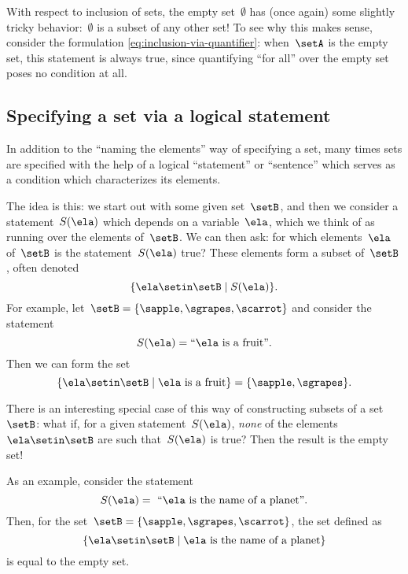With respect to inclusion of sets, the empty set~$\emptyset$ has (once again) some slightly tricky behavior:~$\emptyset$ is a subset of any other set!
To see why this makes sense, consider the formulation \cref{eq:inclusion-via-quantifier}: when~$\setA$ is the empty set, this statement is always true, since quantifying ``for all'' over the empty set poses no condition at all.

\subsection{Specifying a set via a logical statement}

In addition to the ``naming the elements'' way of specifying a set, many times sets are specified with the help of a logical ``statement'' or ``sentence'' which serves as a condition which characterizes its elements.

The idea is this: we start out with some given set~$\setB$, and then we consider a statement~$S(\ela)$ which depends on a variable~$\ela$, which we think of as running over the elements of~$\setB$.
We can then ask: for which elements~$\ela$ of~$\setB$ is the statement~$S(\ela)$ true?
These elements form a subset of~$\setB$, often denoted
%
\begin{equation}
    \label{eq:axiom-specialization}
    \{ \ela \setin\setB \mid S(\ela) \}.
\end{equation}
%
For example, let~$\setB = \{ \sapple, \sgrapes, \scarrot \}$ and consider the statement
%
\begin{equation*}
    S(\ela) = \text{``$\ela$ is a fruit''}.
\end{equation*}
%
Then we can form the set
%
\begin{equation*}
    \{ \ela \setin\setB \mid \ela \text{ is a fruit} \} = \{ \sapple, \sgrapes \}.
\end{equation*}

There is an interesting special case of this way of constructing subsets of a set~$\setB$:
what if, for a given statement~$S(\ela)$, \emph{none} of the elements~$\ela \setin\setB$ are such that~$S(\ela)$ is true?
Then the result is the empty set!

As an example, consider the statement
%
\begin{equation*}
    S(\ela) =\text{ ``} \ela \text{ is the name of a planet''}.
\end{equation*}
%
Then, for the set~$\setB = \{ \sapple, \sgrapes, \scarrot \}$, the set defined as
\begin{equation*}
    \{ \ela \setin\setB \mid \ela \text{ is the name of a planet} \}
\end{equation*}
is equal to the empty set.


